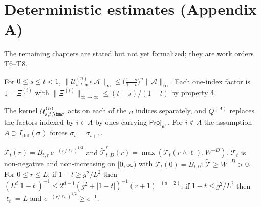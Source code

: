 \chapter{Deterministic estimates (Appendix A)}

The remaining chapters are stated but not yet formalized; they are work orders T6--T8.

\begin{lemma}\label{lem:sum-Ndecay}
  \leanok
  For $0\le s\le t<1$,
  $\|\mathcal U^{(n)}_{s,t,\bm\sigma}\circ\mathcal A\|_\infty\le\bigl(\tfrac{1-s}{1-t}\bigr)^n\|\mathcal A\|_\infty$.
  Each one-index factor is $1+\Xi^{(i)}$ with $\|\Xi^{(i)}\|_{\infty\to\infty}\le(t-s)/(1-t)$ by property 4.
\end{lemma}

\begin{lemma}\label{lem:Ukernel}
  \leanok
  The kernel $\Ucal^{(n)}_{s,t,\bm\sigma}$ acts on each of the $n$ indices separately, and
  $Q^{(A)}$ replaces the factors indexed by $i\in A$ by ones carrying
  $\mathsf{Proj}_{\mathbf e^\perp}$.  For $i\notin A$ the assumption
  $A\supset I_{\mathrm{diff}}(\bm\sigma)$ forces $\sigma_i=\sigma_{i+1}$.
\end{lemma}

\begin{definition}\label{def:tail}
  \leanok
  $\mathcal T_t(r)=B_{t,r}\,e^{-(r/\ell_t)^{1/2}}$ and
  $\widetilde{\mathcal T}^{\ell}_{t,D}(r)=\max(\mathcal T_t(r\wedge\ell),W^{-D})$.  $\mathcal T_t$ is
  non-negative and non-increasing on $[0,\infty)$ with $\mathcal T_t(0)=B_{t,0}$;
  $\widetilde{\mathcal T}\ge W^{-D}>0$.  For $0\le r\le L$: if $1-t\ge g^2/L^2$ then
  $(L^d|1-t|)^{-1}\le 2^{d-1}(g^2+|1-t|)^{-1}(r+1)^{-(d-2)}$; if $1-t\le g^2/L^2$ then
  $\ell_t=L$ and $e^{-(r/\ell_t)^{1/2}}\ge e^{-1}$.
\end{definition}

